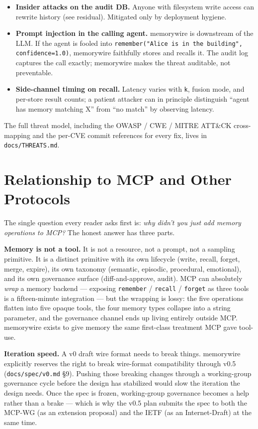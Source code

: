 \documentclass[11pt,letterpaper,twocolumn]{article}
\begin{document}
\begin{itemize}[leftmargin=*]
  \item \textbf{Insider attacks on the audit DB.} Anyone with filesystem write access can rewrite history (see  residual). Mitigated only by deployment hygiene.
  \item \textbf{Prompt injection in the calling agent.} memorywire is downstream of the LLM. If the agent is fooled into \texttt{remember("Alice is in the building", confidence=1.0)}, memorywire faithfully stores and recalls it. The audit log captures the call exactly; memorywire makes the threat auditable, not preventable.
  \item \textbf{Side-channel timing on recall.} Latency varies with \texttt{k}, fusion mode, and per-store result counts; a patient attacker can in principle distinguish ``agent has memory matching X'' from ``no match'' by observing latency.
\end{itemize}

The full threat model, including the OWASP / CWE / MITRE ATT\&CK cross-mapping and the per-CVE commit references for every fix, lives in \texttt{docs/THREATS.md}.

\section{Relationship to MCP and Other Protocols}
\label{sec:mcp}

The single question every reader asks first is: \emph{why didn't you just add memory operations to MCP?} The honest answer has three parts.

\textbf{Memory is not a tool.} It is not a resource, not a prompt, not a sampling primitive. It is a distinct primitive with its own lifecycle (write, recall, forget, merge, expire), its own taxonomy (semantic, episodic, procedural, emotional), and its own governance surface (diff-and-approve, audit). MCP can absolutely \emph{wrap} a memory backend --- exposing \texttt{remember} / \texttt{recall} / \texttt{forget} as three tools is a fifteen-minute integration --- but the wrapping is lossy: the five operations flatten into five opaque tools, the four memory types collapse into a string parameter, and the governance channel ends up living entirely outside MCP. memorywire exists to give memory the same first-class treatment MCP gave tool-use.

\textbf{Iteration speed.} A v0 draft wire format needs to break things. memorywire explicitly reserves the right to break wire-format compatibility through v0.5 (\texttt{docs/spec/v0.md} \S9). Pushing those breaking changes through a working-group governance cycle before the design has stabilized would slow the iteration the design needs. Once the spec is frozen, working-group governance becomes a help rather than a brake --- which is why the v0.5 plan submits the spec to both the MCP-WG (as an extension proposal) and the IETF (as an Internet-Draft) at the same time.
\end{document}
